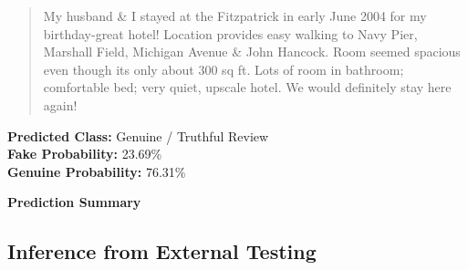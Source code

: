 \documentclass[12pt,a4paper]{report}
\begin{document}
\begin{quote}
My husband \& I stayed at the Fitzpatrick in early June 2004 for my
birthday-great hotel! Location provides easy walking to Navy Pier,
Marshall Field, Michigan Avenue \& John Hancock. Room seemed spacious
even though its only about 300 sq ft. Lots of room in bathroom;
comfortable bed; very quiet, upscale hotel. We would definitely stay
here again!
\end{quote}

\noindent
\textbf{Predicted Class:} Genuine / Truthful Review \\
\textbf{Fake Probability:} 23.69\% \\
\textbf{Genuine Probability:} 76.31\%

\vspace{0.5cm}
\noindent\textbf{Prediction Summary}

\begin{table}[H]
\centering

\caption{Prediction Results for Selected External Reviews}
\label{tab:unseen_predictions}
\end{table}

\subsection{Inference from External Testing}
\end{document}
